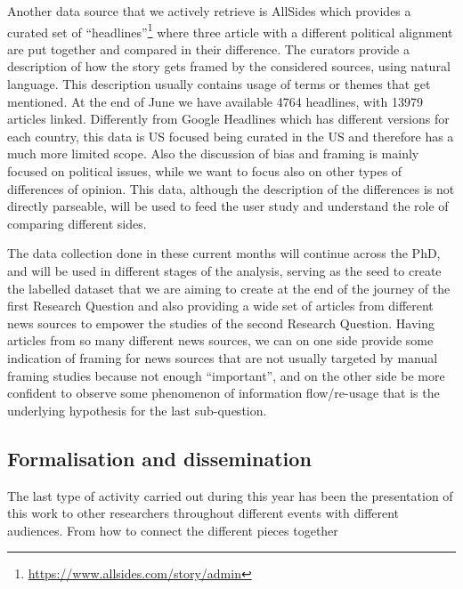 Another data source that we actively retrieve is AllSides which provides a curated set of ``headlines''\footnote{\url{https://www.allsides.com/story/admin}} where three article with a different political alignment are put together and compared in their difference.
The curators provide a description of how the story gets framed by the considered sources, using natural language.
This description usually contains usage of terms or themes that get mentioned.
At the end of June we have available 4764 headlines, with 13979 articles linked.
Differently from Google Headlines which has different versions for each country, this data is US focused being curated in the US and therefore has a much more limited scope. Also the discussion of bias and framing is mainly focused on political issues, while we want to focus also on other types of differences of opinion.
This data, although the description of the differences is not directly parseable, will be used to feed the user study and understand the role of comparing different sides.



The data collection done in these current months will continue across the PhD, and will be used in different stages of the analysis, serving as the seed to create the labelled dataset that we are aiming to create at the end of the journey of the first Research Question and also providing a wide set of articles from different news sources to empower the studies of the second Research Question.
Having articles from so many different news sources, we can on one side provide some indication of framing for news sources that are not usually targeted by manual framing studies because not enough ``important'', and on the other side be more confident to observe some phenomenon of information flow/re-usage that is the underlying hypothesis for the last sub-question.

\subsection{Formalisation and dissemination}
The last type of activity carried out during this year has been the presentation of this work to other researchers throughout different events with different audiences.
From how to connect the different pieces together

